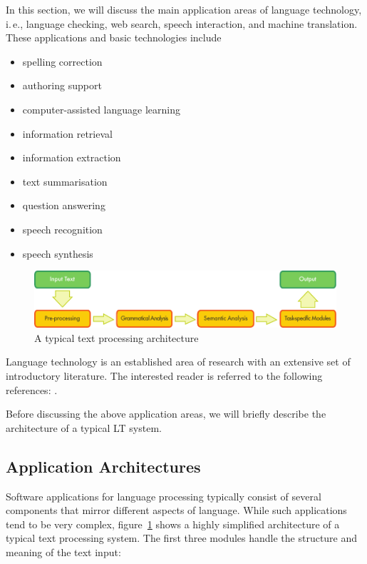 \begin{multicols}{2}
In this section, we will discuss the main application areas of language technology, i.\,e., language checking, web search, speech interaction, and machine translation. These applications and basic technologies include 

\begin{itemize}
\item spelling correction
\item authoring support
\item computer-assisted language learning
\item information retrieval 
\item information extraction
\item text summarisation
\item question answering
\item speech recognition 
\item speech synthesis 
\end{itemize}

\begin{figure}[b]
  \center
  \includegraphics[width=\textwidth]{../_media/english/text_processing_app_architecture}
  \caption{A typical text processing architecture}
  \label{fig:textprocessingarch_en}
\end{figure}

Language technology is an established area of research with an extensive set of introductory literature. The interested reader is referred to the following references: \cite{jurafsky-martin01,manning-schuetze1,lt-world1,lt-survey1}.

Before discussing the above application areas, we will briefly describe the architecture of a typical LT system.

\subsection{Application Architectures}

Software applications for language processing typically consist of several components that mirror different aspects of language. While such applications tend to be very complex, figure~\ref{fig:textprocessingarch_en} shows a highly simplified architecture of a typical text processing system. The first three modules handle the structure and meaning of the text input:


\end{multicols}
